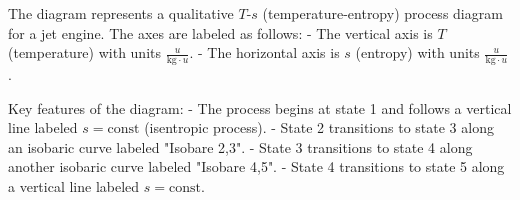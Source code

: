 The diagram represents a qualitative \( T \)-\( s \) (temperature-entropy) process diagram for a jet engine. The axes are labeled as follows:  
- The vertical axis is \( T \) (temperature) with units \( \frac{u}{\text{kg} \cdot u} \).  
- The horizontal axis is \( s \) (entropy) with units \( \frac{u}{\text{kg} \cdot u} \).  

Key features of the diagram:  
- The process begins at state 1 and follows a vertical line labeled \( s = \text{const} \) (isentropic process).  
- State 2 transitions to state 3 along an isobaric curve labeled "Isobare 2,3".  
- State 3 transitions to state 4 along another isobaric curve labeled "Isobare 4,5".  
- State 4 transitions to state 5 along a vertical line labeled \( s = \text{const} \).